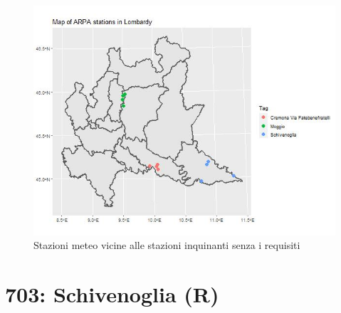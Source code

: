 \documentclass{article}
\begin{document}
\begin{figure}[H]
  \centering
  \includegraphics[scale = 0.4]{Picture/WStationsOfInterest.jpeg}
  \caption{Stazioni meteo vicine alle stazioni inquinanti senza i requisiti}
\end{figure}

\section{703: Schivenoglia (R)}
\end{document}
